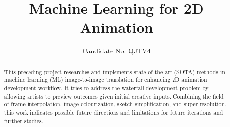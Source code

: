 
\title{Machine Learning for 2D Animation}
\author{Candidate No. QJTV4}  %

\maketitle
\makedeclaration

\begin{abstract} %
This preceding project researches and implements state-of-the-art (SOTA) methods in machine learning (ML) image-to-image translation for enhancing 2D animation development workflow. It tries to address the waterfall development problem by allowing artists to preview outcomes given initial creative inputs. Combining the field of frame interpolation, image colourization, sketch simplification, and super-resolution, this work indicates possible future directions and limitations for future iterations and further studies.
\end{abstract}


